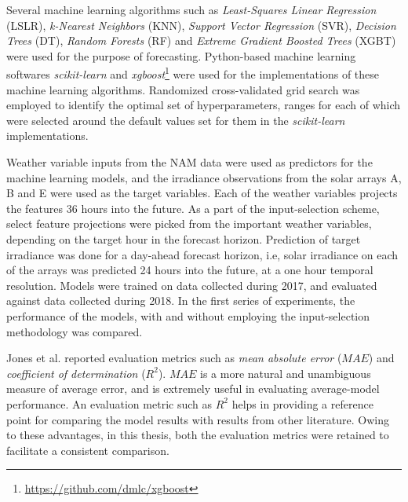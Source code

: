 \par Several machine learning algorithms such as \textit{Least-Squares Linear Regression} (LSLR), \textit{k-Nearest Neighbors} (KNN), \textit{Support Vector Regression} (SVR), \textit{Decision Trees} (DT), \textit{Random Forests} (RF) and \textit{Extreme Gradient Boosted Trees} (XGBT) were used for the purpose of forecasting. Python-based machine learning softwares \textit{scikit-learn} and \textit{xgboost}\footnote{\url{https://github.com/dmlc/xgboost}} were used for the implementations of these machine learning algorithms. Randomized cross-validated grid search was employed to identify the optimal set of hyperparameters, ranges for each of which were selected around the default values set for them in the \textit{scikit-learn} implementations.

\par Weather variable inputs from the NAM data were used as predictors for the machine learning models, and the irradiance observations from the solar arrays A, B and E were used as the target variables. Each of the weather variables projects the features 36 hours into the future. As a part of the input-selection scheme, select feature projections were picked from the important weather variables, depending on the target hour in the forecast horizon. Prediction of target irradiance was done for a day-ahead forecast horizon, i.e, solar irradiance on each of the arrays was predicted 24 hours into the future, at a one hour temporal resolution. Models were trained on data collected during 2017, and evaluated against data collected during 2018. In the first series of experiments, the performance of the models, with and without employing the input-selection methodology was compared.

\par Jones et al. reported evaluation metrics such as \textit{mean absolute error} ($MAE$) and \textit{coefficient of determination} ($R^2$). $MAE$ is a more natural and unambiguous measure of average error, and is extremely useful in evaluating average-model performance. An evaluation metric such as $R^2$ helps in providing a reference point for comparing the model results with results from other literature. Owing to these advantages, in this thesis, both the evaluation metrics were retained to facilitate a consistent comparison.

